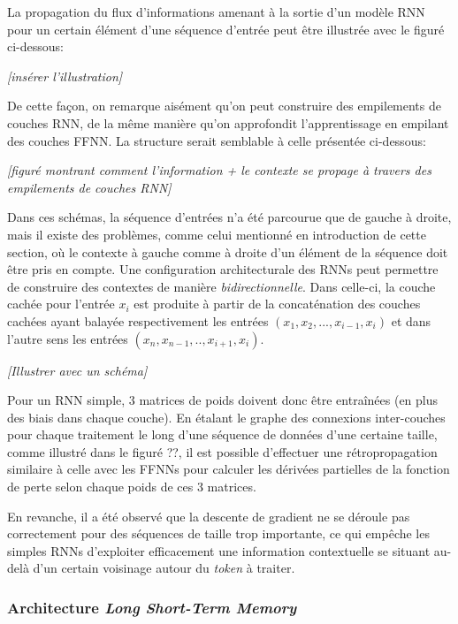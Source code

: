 \documentclass[12pt, french, twoside]{report}
\begin{document}
La propagation du flux d'informations amenant à la sortie d'un modèle RNN pour un certain élément d'une séquence d'entrée peut être illustrée avec le figuré ci-dessous:

\textit{[insérer l'illustration]}\cite[1-4]{jurafsky_rnn-lstm}

De cette façon, on remarque aisément qu'on peut construire des empilements de couches RNN, de la même manière qu'on approfondit l'apprentissage en empilant des couches FFNN. La structure serait semblable à celle présentée ci-dessous:

\textit{[figuré montrant comment l'information + le contexte se propage à travers des empilements de couches RNN]}

Dans ces schémas, la séquence d'entrées n'a été parcourue que de gauche à droite, mais il existe des problèmes, comme celui mentionné en introduction de cette section, où le contexte à gauche comme à droite d'un élément de la séquence doit être pris en compte. Une configuration architecturale des RNNs peut permettre de construire des contextes de manière \textit{bidirectionnelle}. Dans celle-ci, la couche cachée pour l'entrée $x_i$ est produite à partir de la concaténation des couches cachées ayant balayée respectivement les entrées $(x_1, x_2, ..., x_{i-1}, x_{i})$ et dans l'autre sens les entrées $(x_n, x_{n-1}, .., x_{i+1}, x_i)$.

\textit{[Illustrer avec un schéma]}\cite[11-13]{jurafsky_rnn-lstm}

\vspace{12pt}
Pour un RNN simple, 3 matrices de poids doivent donc être entraînées (en plus des biais dans chaque couche). En étalant le graphe des connexions inter-couches pour chaque traitement le long d'une séquence de données d'une certaine taille, comme illustré dans le figuré ??, il est possible d'effectuer une rétropropagation similaire à celle avec les FFNNs pour calculer les dérivées partielles de la fonction de perte selon chaque poids de ces 3 matrices.\cite[4, 5]{jurafsky_rnn-lstm}

En revanche, il a été observé que la descente de gradient ne se déroule pas correctement pour des séquences de taille trop importante, ce qui empêche les simples RNNs d'exploiter efficacement une information contextuelle se situant au-delà d'un certain voisinage autour du \textit{token} à traiter.\cite[25-26]{fourrier}

\subsubsection{Architecture \textit{Long Short-Term Memory}}
\end{document}

